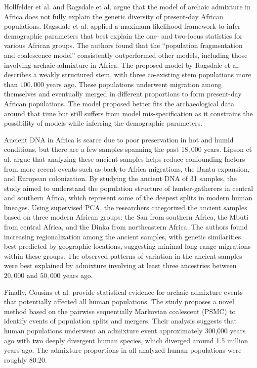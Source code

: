 Hollfelder et al. \cite{hollfelder2021deep} and Ragsdale et al. \cite{ragsdale2023weakly} argue that the model of archaic admixture in Africa does not fully explain the genetic diversity of present-day African populations. Ragsdale et al. applied a maximum likelihood framework to infer demographic parameters that best explain the one- and two-locus statistics for various African groups. The authors found that the ``population fragmentation and coalescence model'' \cite{scerri2019beyond} consistently outperformed other models, including those involving archaic admixture in Africa. The proposed model by Ragsdale et al. describes a weakly structured stem, with three co-existing stem populations more than $100{,}000$ years ago. These populations underwent migration among themselves and eventually merged in different proportions to form present-day African populations. The model proposed better fits the archaeological data around that time but still suffers from model mis-specification as it constrains the possibility of models while inferring the demographic parameters.

Ancient DNA in Africa is scarce due to poor preservation in hot and humid conditions, but there are a few samples spanning the past $18{,}000$ years. Lipson et al. \cite{lipson2022ancient} argue that analyzing these ancient samples helps reduce confounding factors from more recent events such as back-to-Africa migrations, the Bantu expansion, and European colonization. By studying the ancient DNA of 31 samples, the study aimed to understand the population structure of hunter-gatherers in central and southern Africa, which represent some of the deepest splits in modern human lineages. Using supervised PCA, the researchers categorized the ancient samples based on three modern African groups: the San from southern Africa, the Mbuti from central Africa, and the Dinka from northeastern Africa. The authors found increasing regionalization among the ancient samples, with genetic similarities best predicted by geographic locations, suggesting minimal long-range migrations within these groups. The observed patterns of variation in the ancient samples were best explained by admixture involving at least three ancestries between $20{,}000$ and $50{,}000$ years ago.

Finally, Cousins et al. \cite{cousins2024structured} provide statistical evidence for archaic admixture events that potentially affected all human populations. The study proposes a novel method based on the pairwise sequentially Markovian coalescent (PSMC) to identify events of population splits and mergers. Their analysis suggests that human populations underwent an admixture event approximately 300,000 years ago with two deeply divergent human species, which diverged around 1.5 million years ago. The admixture proportions in all analyzed human populations were roughly 80:20.

